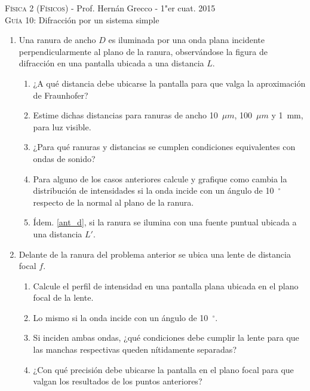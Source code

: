 \documentclass[11pt,spanish,a4paper]{article}
\begin{document}
\begin{center}
    \textsc{\large Física 2 (Físicos)} - Prof. Hernán Grecco - 1"er cuat. 2015\\
	\textsc{\large Guía 10:} Difracción por un sistema simple
\end{center}




\begin{enumerate}

\item Una ranura de ancho \( D \) es iluminada por una onda plana incidente perpendicularmente al plano de la ranura, observándose la figura de difracción en una pantalla ubicada a una distancia \( L \).
	\begin{enumerate}
		\item ¿A qué distancia debe ubicarse la pantalla para que valga la aproximación de Fraunhofer?
		\item Estime dichas distancias para ranuras de ancho \SI{10}{\( \mu m \)}, \SI{100}{\( \mu m \)} y \SI{1}{mm}, para luz visible.
		\item ¿Para qué ranuras y distancias se cumplen condiciones equivalentes con ondas de sonido?
		\item \label{ant_d} Para alguno de los casos anteriores calcule y grafique como cambia la distribución de intensidades si la onda incide con un ángulo de \SI{10}{\(^\circ\)} respecto de la normal al plano de la ranura.
		\item Ídem. \ref{ant_d}, si la ranura se ilumina con una fuente puntual ubicada a una distancia \( L' \).
	\end{enumerate}
	

\item Delante de la ranura del problema anterior se ubica una lente de distancia focal \( f \).
	\begin{enumerate}
		\item Calcule el perfil de intensidad en una pantalla plana ubicada en el plano focal de la	lente.
		\item Lo mismo si la onda incide con un ángulo de \SI{10}{\(^\circ\)}.
		\item Si inciden ambas ondas, ¿qué condiciones debe cumplir la lente para que las manchas respectivas queden nítidamente separadas?
		\item ¿Con qué precisión debe ubicarse la pantalla en el plano focal para que valgan los resultados de los puntos anteriores?
	\end{enumerate}



\end{enumerate}
\end{document}
